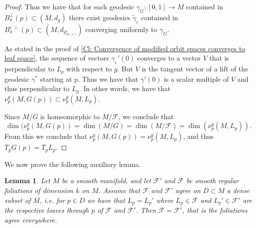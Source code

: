 \documentclass[12pt,a4paper,reqno]{amsart}
\newtheorem{lemma}[theorem]{Lemma}
\theoremstyle{definition}
\numberwithin{equation}{section}
\newcommand{\fol}{\mathcal{F}}
\DeclareMathOperator{\dime}{dim}
\begin{document}
\begin{proof}
Thus we have that for each geodesic $\gamma_G\colon [0,1]\to M$ contained in $B_\delta^\perp(p)\subset (M,d_{g})$ there exist geodesics $\tilde{\gamma}_\varepsilon$ contained in $B_\delta^{\varepsilon\, \perp}(p)\subset (M,d_{g^\varepsilon_{N(\varepsilon)}})$ converging uniformly to $\gamma_G$.  

As stated in the proof of \th\ref{Cl: Convergence of modified orbit spaces converges to leaf space}, the sequence of vectors $\gamma_\varepsilon'(0)$ converges to a vector $V$ that is perpendicular to $L_p$ with respect to $g$. But $V$ is the tangent vector of a lift of the geodesic $\gamma^\ast$ starting at $p$. Thus we have that $\gamma'(0)$ is a scalar multiple of $V$ and thus perpendicular to $L_p$. In other words, we have that $\nu^g_p(M,G(p))\subset \nu^g_p(M,L_p)$.
 
Since $M/G$ is homeomorphic to $M/\fol$, we conclude that 
\[
\dime(\nu^g_p(M,G(p))=\dime(M/G) = \dime(M/\fol) =\dime( \nu^g_p(M,L_p)).
\] 
From this  we conclude that $\nu^g_p(M,G(p))=\nu^g_p(M,L_p)$, and thus $T_pG(p)=T_pL_p$.
\end{proof} 

We now prove the following auxiliary lemma.

\begin{lemma}\th\label{L: singular Riemannian foliation determined on principal part}
Let $M$ be a smooth manifold, and let $\fol'$ and $\fol$ be smooth regular foliations of dimension $k$ on $M$. Assume that $\fol$ and $\fol'$ agree on $D\subset M$ a dense subset of $M$, i.e. for $p\in D$ we have that $L_p = L_p'$ where $L_p\in \fol$ and $L_p'\in \fol'$ are the respective leaves through $p$ of $\fol$ and $\fol'$. Then $\fol = \fol'$, that is the foliations agree everywhere.
\end{lemma}
\end{document}
